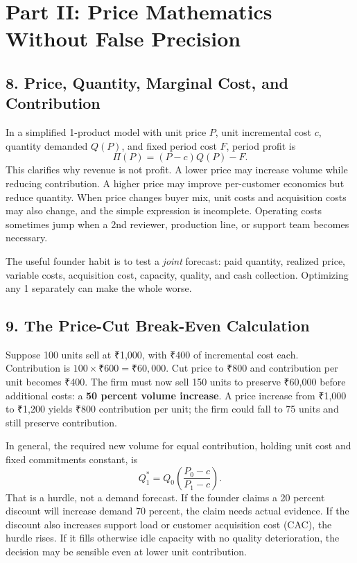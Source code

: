 \section*{Part II: Price Mathematics Without False Precision}

\subsection*{8. Price, Quantity, Marginal Cost, and Contribution}

In a simplified 1-product model with unit price $P$, unit incremental cost $c$, quantity demanded $Q(P)$, and fixed period cost $F$, period profit is
\begin{equation}
\Pi(P) = (P - c)Q(P) - F.
\end{equation}
This clarifies why revenue is not profit. A lower price may increase volume while reducing contribution. A higher price may improve per-customer economics but reduce quantity. When price changes buyer mix, unit costs and acquisition costs may also change, and the simple expression is incomplete. Operating costs sometimes jump when a 2nd reviewer, production line, or support team becomes necessary.

The useful founder habit is to test a \emph{joint} forecast: paid quantity, realized price, variable costs, acquisition cost, capacity, quality, and cash collection. Optimizing any 1 separately can make the whole worse.

\subsection*{9. The Price-Cut Break-Even Calculation}

Suppose 100 units sell at ₹1,000, with ₹400 of incremental cost each. Contribution is $100 \times ₹600 = ₹60,000$. Cut price to ₹800 and contribution per unit becomes ₹400. The firm must now sell 150 units to preserve ₹60,000 before additional costs: a \textbf{50 percent volume increase}. A price increase from ₹1,000 to ₹1,200 yields ₹800 contribution per unit; the firm could fall to 75 units and still preserve contribution.

In general, the required new volume for equal contribution, holding unit cost and fixed commitments constant, is
\begin{equation}
Q_1^* = Q_0 \left( \frac{P_0 - c}{P_1 - c} \right).
\end{equation}
That is a hurdle, not a demand forecast. If the founder claims a 20 percent discount will increase demand 70 percent, the claim needs actual evidence. If the discount also increases support load or customer acquisition cost (CAC), the hurdle rises. If it fills otherwise idle capacity with no quality deterioration, the decision may be sensible even at lower unit contribution.

